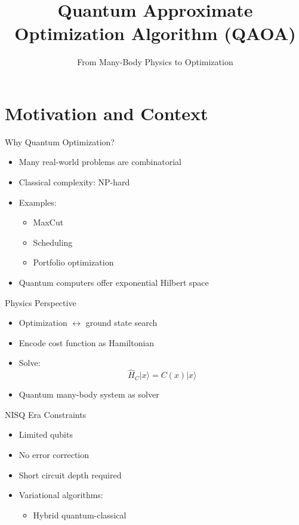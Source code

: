 \documentclass{beamer}
\title{Quantum Approximate Optimization Algorithm (QAOA)}
\subtitle{From Many-Body Physics to Optimization}
\author{}
\date{}
\begin{document}
\frame{\titlepage}

\section{Motivation and Context}

\begin{frame}{Why Quantum Optimization?}
\begin{itemize}
\item Many real-world problems are combinatorial
\item Classical complexity: NP-hard
\item Examples:
\begin{itemize}
\item MaxCut
\item Scheduling
\item Portfolio optimization
\end{itemize}
\item Quantum computers offer exponential Hilbert space
\end{itemize}
\end{frame}


\begin{frame}{Physics Perspective}
\begin{itemize}
\item Optimization $\leftrightarrow$ ground state search
\item Encode cost function as Hamiltonian
\item Solve:
\[
\hat{H}_C |x\rangle = C(x)|x\rangle
\]
\item Quantum many-body system as solver
\end{itemize}
\end{frame}


\begin{frame}{NISQ Era Constraints}
\begin{itemize}
\item Limited qubits
\item No error correction
\item Short circuit depth required
\item Variational algorithms:
\begin{itemize}
\item Hybrid quantum-classical
\end{itemize}
\end{itemize}
\end{frame}
\end{document}
